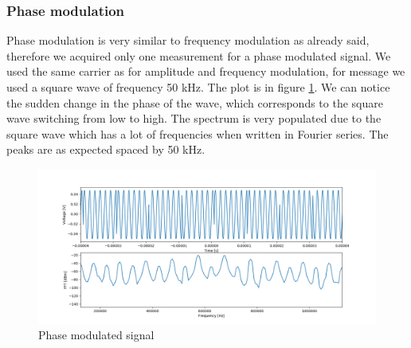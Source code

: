 \documentclass[a4paper,10pt]{article}
\begin{document}
\subsubsection{Phase modulation}
Phase modulation is very similar to frequency modulation as already said, therefore we acquired only one measurement for a phase modulated signal. We used the same carrier as for amplitude and frequency modulation, for message we used a square wave of frequency 50 kHz. The plot is in figure \ref{phase}. We can notice the sudden change in the phase of the wave, which corresponds to the square wave switching from low to high. The spectrum is very populated due to the square wave which has a lot of frequencies when written in Fourier series. The peaks are as expected spaced by 50 kHz.
\begin{figure}[H]
\centering
\includegraphics[width=\textwidth]{phase1}
\caption{Phase modulated signal}\label{phase}
\end{figure}
\end{document}
